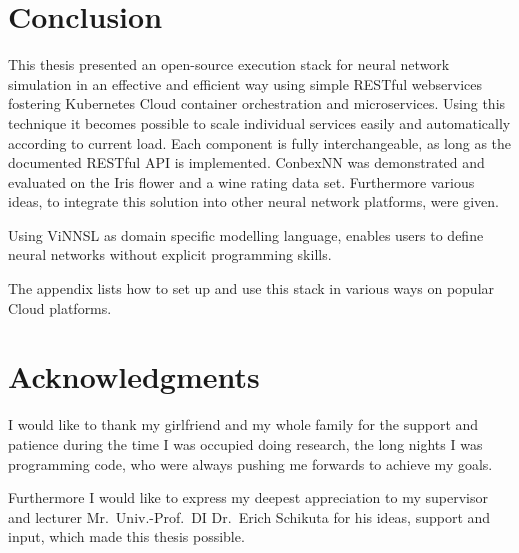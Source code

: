 \chapter{Conclusion}\label{conclusion}

This thesis presented an open-source execution stack for neural network
simulation in an effective and efficient way using simple RESTful
webservices fostering Kubernetes Cloud container orchestration and
microservices. Using this technique it becomes possible to scale
individual services easily and automatically according to current load.
Each component is fully interchangeable, as long as the documented
RESTful API is implemented. ConbexNN was demonstrated and evaluated on
the Iris flower and a wine rating data set. Furthermore various ideas,
to integrate this solution into other neural network platforms, were
given.

Using ViNNSL as domain specific modelling language, enables users to
define neural networks without explicit programming skills.

The appendix lists how to set up and use this stack in various ways on
popular Cloud platforms.

\chapter{Acknowledgments}\label{acknowledgments}

I would like to thank my girlfriend and my whole family for the support
and patience during the time I was occupied doing research, the long
nights I was programming code, who were always pushing me forwards to
achieve my goals.

Furthermore I would like to express my deepest appreciation to my
supervisor and lecturer Mr.~Univ.-Prof.~DI Dr.~Erich Schikuta for his
ideas, support and input, which made this thesis possible.
